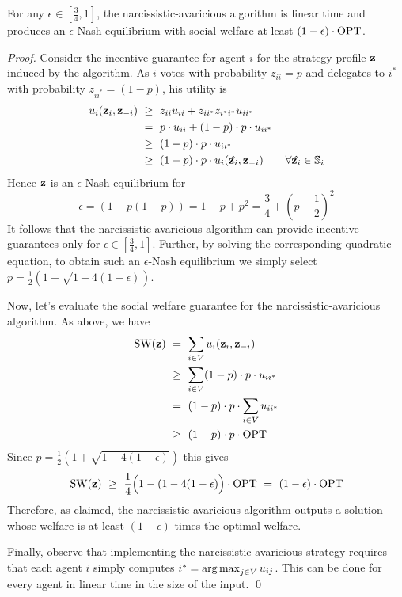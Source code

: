 \begin{thm}\label{thm:approx}
For any $\epsilon\in[\frac{3}{4},1]$, the narcissistic-avaricious algorithm is linear time and produces an
$\epsilon$-Nash equilibrium with social welfare at least $(1-\epsilon)\cdot \operatorname{OPT}$.
\end{thm}
\begin{proof}
Consider the incentive guarantee for agent $i$ for the strategy profile ${\bf z}$ induced by the algorithm.
As $i$ votes with probability $z_{ii}=p$ and delegates to $i^*$ with probability $z_{ii^*}=(1-p)$,
his utility is 
\begin{align*}
		u_i({\bf z}_i,{\bf z}_{-i}) &\ \geq\ z_{ii}u_{ii} + z_{i i^*} z_{i^* i^*}  u_{ii^*} \\
		&\ =\ p\cdot u_{ii} + (1-p) \cdot p\cdot u_{ii^*} \\
		&\ \geq\ (1-p)\cdot p\cdot u_{ii^*} \\
		&\ \geq\ (1-p)\cdot p \cdot u_i(\hat{{\bf z}_i},{\bf z}_{-i}) \qquad \forall \hat{{\bf z}_i}\in \mathbb{S}_i
\end{align*}
Hence ${\bf z}$ is an $\epsilon$-Nash equilibrium for 
$$\epsilon=(1-p(1-p))=1-p+p^2=\frac34 +(p-\frac12)^2$$
It follows that the narcissistic-avaricious algorithm can provide incentive guarantees only for $\epsilon\in[\frac{3}{4},1]$.
Further, by solving the corresponding quadratic equation, to obtain such an $\epsilon$-Nash equilibrium we simply 
select $p=\frac12\left(1+\sqrt{1-4(1-\epsilon)}\right)$.

Now, let's evaluate the social welfare guarantee for the narcissistic-avaricious algorithm.	
As above, we have
 \begin{align*}
	 	\operatorname{SW}({\bf z}) &\ =\ \sum_{i\in V} u_i({\bf z}_i,{\bf z}_{-i})\\
		&\ \geq\ \sum_{i\in V} (1-p)\cdot p\cdot u_{ii^*} \\
	 	&\ =\  (1-p)\cdot p\cdot\sum_{i\in V} u_{ii^*}\\
		&\ \geq\ (1-p)\cdot p\cdot \operatorname{OPT} 
 \end{align*}
 Since $p=\frac12\left(1+\sqrt{1-4(1-\epsilon)}\right)$ this gives
 $$\SW(\z) \ \ge\ \frac14\Big(1-(1-4(1-\epsilon)\Big)\cdot \Opt \ = \ (1-\epsilon)\cdot \Opt$$
Therefore, as claimed, the narcissistic-avaricious algorithm outputs a solution whose welfare is at least $(1-\epsilon)$
times the optimal welfare. 

Finally, observe that implementing the narcissistic-avaricious strategy requires that each agent $i$ simply 
computes $i^*=\operatorname*{arg\,max}_{j\in V} u_{ij}$. This can be done for every agent in linear time in the size of the input.
\qed
\end{proof}

